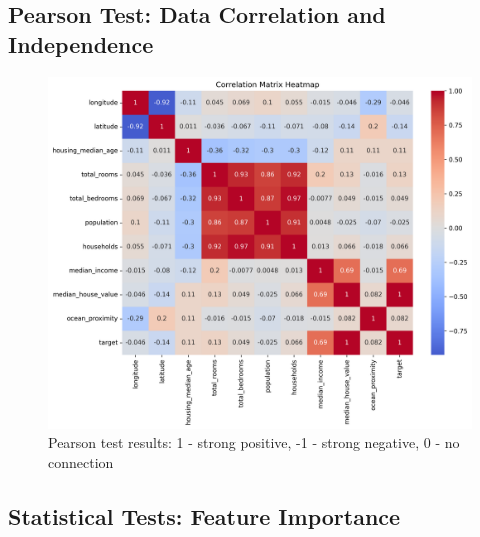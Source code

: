 \documentclass[a4paper, 11pt]{article}
\begin{document}
\subsection{Pearson Test: Data Correlation and Independence}
\begin{figure}[h]
    \centering
    \includegraphics[scale=0.5]{figs/correlation_heatmap.png}
    \caption{Pearson test results: 1 - strong positive, -1 - strong negative, 0 - no connection}
    \label{fig:correlation_heatmap}
\end{figure}

\subsection{Statistical Tests: Feature Importance}
\end{document}
